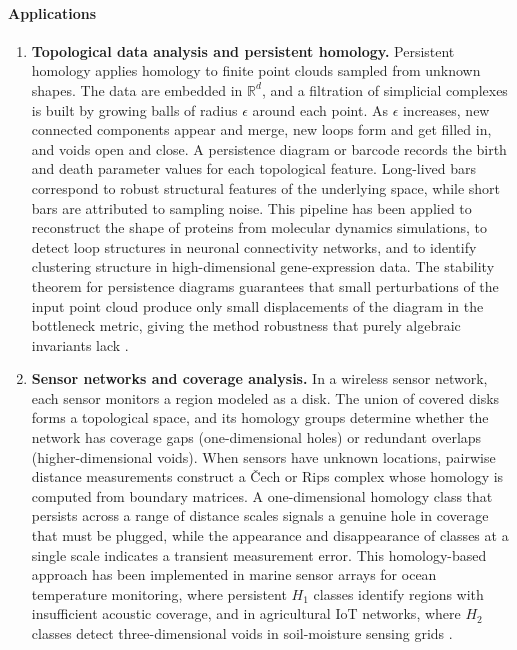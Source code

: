 \paragraph{Applications}
\begin{enumerate}[leftmargin=*,itemsep=0.35em]
\item \textbf{Topological data analysis and persistent homology.} Persistent homology applies homology to finite point clouds sampled from unknown shapes. The data are embedded in $\mathbb R^d$, and a filtration of simplicial complexes is built by growing balls of radius $\epsilon$ around each point. As $\epsilon$ increases, new connected components appear and merge, new loops form and get filled in, and voids open and close. A persistence diagram or barcode records the birth and death parameter values for each topological feature. Long-lived bars correspond to robust structural features of the underlying space, while short bars are attributed to sampling noise. This pipeline has been applied to reconstruct the shape of proteins from molecular dynamics simulations, to detect loop structures in neuronal connectivity networks, and to identify clustering structure in high-dimensional gene-expression data. The stability theorem for persistence diagrams guarantees that small perturbations of the input point cloud produce only small displacements of the diagram in the bottleneck metric, giving the method robustness that purely algebraic invariants lack \cite{homology_theory_ref3}.
\item \textbf{Sensor networks and coverage analysis.} In a wireless sensor network, each sensor monitors a region modeled as a disk. The union of covered disks forms a topological space, and its homology groups determine whether the network has coverage gaps (one-dimensional holes) or redundant overlaps (higher-dimensional voids). When sensors have unknown locations, pairwise distance measurements construct a \v{C}ech or Rips complex whose homology is computed from boundary matrices. A one-dimensional homology class that persists across a range of distance scales signals a genuine hole in coverage that must be plugged, while the appearance and disappearance of classes at a single scale indicates a transient measurement error. This homology-based approach has been implemented in marine sensor arrays for ocean temperature monitoring, where persistent $H_1$ classes identify regions with insufficient acoustic coverage, and in agricultural IoT networks, where $H_2$ classes detect three-dimensional voids in soil-moisture sensing grids \cite{homology_theory_ref3,homology_theory_ref4}.
\end{enumerate}
